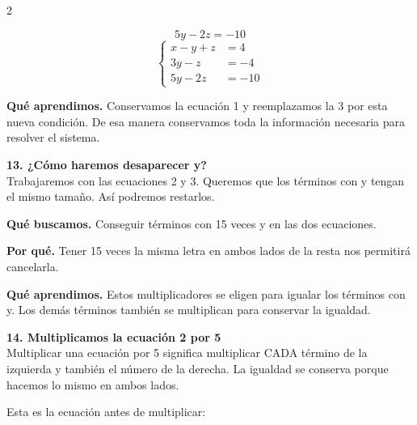 \documentclass[11pt,a4paper,landscape]{article}
\begin{document}
\begin{multicols*}{2}
\begin{minipage}{\linewidth}
\[5y - 2z = -10\]
\[\left\{\begin{aligned}x - y + z &= 4\\3y - z &= -4\\5y - 2z &= -10\end{aligned}\right.\]
\par\smallskip\textbf{Qué aprendimos.} Conservamos la ecuación 1 y reemplazamos la 3 por esta nueva condición. De esa manera conservamos toda la información necesaria para resolver el sistema.
\end{minipage}\par\medskip
\noindent\begin{minipage}{\linewidth}\textbf{13. ¿Cómo haremos desaparecer y?}\\[2pt]Trabajaremos con las ecuaciones 2 y 3. Queremos que los términos con y tengan el mismo tamaño. Así podremos restarlos.
\par\smallskip\textbf{Qué buscamos.} Conseguir términos con 15 veces y en las dos ecuaciones.
\par\smallskip\textbf{Por qué.} Tener 15 veces la misma letra en ambos lados de la resta nos permitirá cancelarla.
\par{}\par\smallskip
\par\smallskip\textbf{Qué aprendimos.} Estos multiplicadores se eligen para igualar los términos con y. Los demás términos también se multiplican para conservar la igualdad.
\end{minipage}\par\medskip
\noindent\begin{minipage}{\linewidth}\textbf{14. Multiplicamos la ecuación 2 por 5}\\[2pt]Multiplicar una ecuación por 5 significa multiplicar CADA término de la izquierda y también el número de la derecha. La igualdad se conserva porque hacemos lo mismo en ambos lados.
\par\smallskip Esta es la ecuación antes de multiplicar:

\end{minipage}
\end{multicols*}
\end{document}
